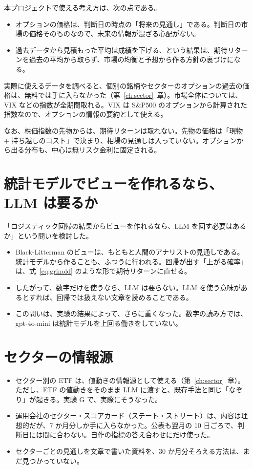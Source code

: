 \documentclass[xelatex,ja=standard,jafont=hiragino-pron,a4paper,10pt]{bxjsreport}
\newcommand{\SP}{S\&P500}
\newcommand{\chapref}[1]{第~\ref{#1}~章}
\begin{document}
本プロジェクトで使える考え方は、次の点である。

\begin{itemize}
\item オプションの価格は、判断日の時点の「将来の見通し」である。判断日の市場の価格そのものなので、未来の情報が混ざる心配がない。
\item 過去データから見積もった平均は成績を下げる、という結果は、期待リターンを過去の平均から取らず、市場の均衡と予想から作る方針の裏づけになる。
\end{itemize}

実際に使えるデータを調べると、個別の銘柄やセクターのオプションの過去の価格は、無料では手に入らなかった（\chapref{ch:sector}）。市場全体については、VIX などの指数が全期間取れる。VIX は \SP{} のオプションから計算された指数なので、オプションの情報の要約として使える。

なお、株価指数の先物からは、期待リターンは取れない。先物の価格は「現物 $+$ 持ち越しのコスト」で決まり、相場の見通しは入っていない。オプションから出る分布も、中心は無リスク金利に固定される。

\section{統計モデルでビューを作れるなら、LLM は要るか}

「ロジスティック回帰の結果からビューを作れるなら、LLM を回す必要はあるか」という問いを検討した。

\begin{itemize}
\item Black-Litterman のビューは、もともと人間のアナリストの見通しである。統計モデルから作ることも、ふつうに行われる。回帰が出す「上がる確率」は、式~\eqref{eq:grinold} のような形で期待リターンに直せる。
\item したがって、数字だけを使うなら、LLM は要らない。LLM を使う意味があるとすれば、回帰では扱えない文章を読めることである。
\item この問いは、実験の結果によって、さらに重くなった。数字の読み方では、gpt-4o-mini は統計モデルを上回る働きをしていない。
\end{itemize}

\section{セクターの情報源}

\begin{itemize}
\item セクター別の ETF は、値動きの情報源として使える（\chapref{ch:sector}）。ただし、ETF の値動きをそのまま LLM に渡すと、既存手法と同じ「なぞり」が起きる。実験 G で、実際にそうなった。
\item 運用会社のセクター・スコアカード（ステート・ストリート）は、内容は理想的だが、7 か月分しか手に入らなかった。公表も翌月の 10 日ごろで、判断日には間に合わない。自作の指標の答え合わせにだけ使った。
\item セクターごとの見通しを文章で書いた資料を、30 か月分そろえる方法は、まだ見つかっていない。
\end{itemize}
\end{document}
